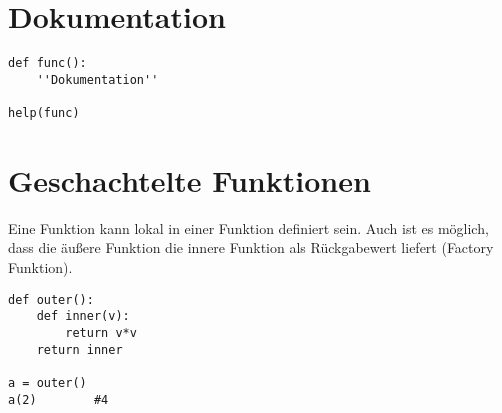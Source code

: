 \section{Dokumentation}
\begin{lstlisting}
def func():
    ''Dokumentation''
    
help(func)
\end{lstlisting}
\section{Geschachtelte Funktionen}
Eine Funktion kann lokal in einer Funktion definiert sein. Auch ist es möglich, dass die äußere Funktion die innere Funktion als Rückgabewert liefert (Factory Funktion).
\begin{lstlisting}
def outer():
    def inner(v):
        return v*v
    return inner
    
a = outer()
a(2)		#4
\end{lstlisting}

